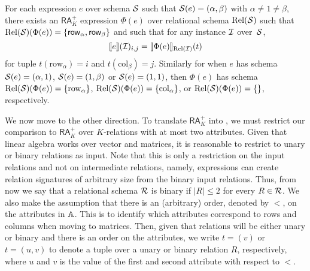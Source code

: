 \begin{proposition}\label{prop:sum_to_ara} 
	For each \langsum expression $e$ over schema $\mathcal{S}$ such that $\mathcal{S}(e)=(\alpha,\beta)$ with $\alpha\neq 1\neq\beta$, there exists an $\mathsf{RA}_{K}^+$  expression $\Phi(e)$ over relational schema $\text{Rel}(\mathcal{S})$ such that $\text{Rel}(\mathcal{S})(\Phi(e))=\{\mathsf{row}_\alpha,\mathsf{row}_\beta\}$ and 
	such that for any instance $\mathcal{I}$ over~$\mathcal{S}$,
	$$
	\llbracket e \rrbracket(\mathcal{I})_{i,j}=\llbracket \Phi(e) \rrbracket_{\text{Rel}(\mathcal{I})}(t)
	$$
	for tuple $t(\mathrm{row}_\alpha)=i$ and $t(\mathrm{col}_\beta)=j$. Similarly for when $e$ has schema $\mathcal{S}(e)=(\alpha,1)$, $\mathcal{S}(e)=(1,\beta)$ or $\mathcal{S}(e)=(1,1)$, then $\Phi(e)$ has schema $\text{Rel}(\mathcal{S})(\Phi(e))=\{\mathrm{row}_\alpha\}$,
	$\text{Rel}(\mathcal{S})(\Phi(e))=\{\mathrm{col}_\alpha\}$, or
	$\text{Rel}(\mathcal{S})(\Phi(e))=\{\}$, respectively.
\end{proposition}

We now move to the other direction.
To translate $\mathsf{RA}_{K}^+$  into \langsum, we must restrict our comparison to $\mathsf{RA}_{K}^+$  over $K$-relations with at most two attributes. Given that linear algebra works over vector and matrices, it is reasonable to restrict to unary or binary relations as input. Note that this is only a restriction on the input relations and not on intermediate relations, namely, expressions can create relation signatures of arbitrary size from the binary input relations. 
Thus, from now we say that a relational schema $\mathcal{R}$ is binary if $|R| \leq 2$ for every $R \in \mathcal{R}$. We also make the assumption that there is an (arbitrary) order, denoted by $<$, on the attributes in $\mathbb{A}$. 
This is to identify which attributes correspond to rows and columns when moving to matrices. 
Then, given that relations will be  either unary or binary and there is an order on the attributes, we write $t = (v)$ or $t = (u,v)$ to denote a tuple over a unary or binary relation $R$, respectively, where $u$ and $v$ is the value of the first and second attribute with respect to $<$.

